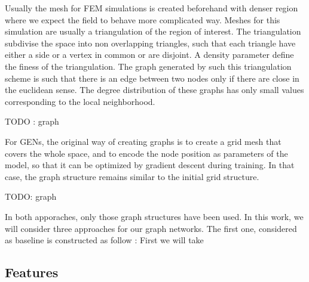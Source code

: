 \documentclass[a4paper,10pt]{article}
\begin{document}
Usually the mesh for FEM simulations is created beforehand with denser region where we expect the field to behave more complicated way. Meshes for this simulation are usually a triangulation of the region of interest. The triangulation subdivise the space into non overlapping triangles, such that each triangle have either a side or a vertex in common or are disjoint. A density parameter define the finess of the triangulation. The graph generated by such this triangulation scheme is such that there is an edge between two nodes only if there are close in the euclidean sense. The degree distribution of these graphs has only small values corresponding to the local neighborhood.

TODO : graph

For GENs, the original way of creating graphs is to create a grid mesh that covers the whole space, and to encode the node position as parameters of the model, so that it can be optimized by gradient descent during training. In that case, the graph structure remains similar to the initial grid structure.

TODO: graph

In both apporaches, only those graph structures have been used. In this work, we will consider three approaches for our graph networks. The first one, considered as baseline is constructed as follow : First we will take

\subsection{Features}




\end{document}
